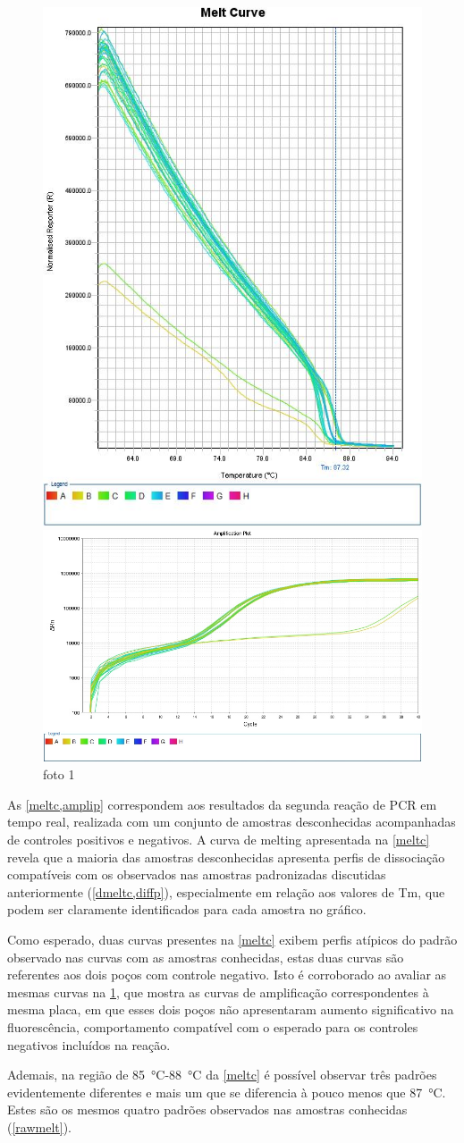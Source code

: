 \begin{figure}
        \centering
        \includegraphics[width=.4\textwidth]{fig/Melt Curve.jpg}
        \caption{foto 1}
        \label{meltc}
        \includegraphics[width=.4\textwidth]{fig/Amplification Plot.jpg}
        \caption{foto 1}
        \label{amplip}
\end{figure}

As \cref{meltc,amplip} correspondem aos resultados da segunda reação de PCR em
tempo real, realizada com um conjunto de amostras desconhecidas acompanhadas de
controles positivos e negativos. A curva de melting apresentada na \cref{meltc}
revela que a maioria das amostras desconhecidas apresenta perfis de dissociação
compatíveis com os observados nas amostras padronizadas discutidas anteriormente
(\cref{dmeltc,diffp}), especialmente em relação aos valores de Tm, que podem ser
claramente identificados para cada amostra no gráfico.

Como esperado, duas curvas presentes na \cref{meltc} exibem perfis atípicos do
padrão observado nas curvas com as amostras conhecidas, estas duas curvas são
referentes aos dois poços com controle negativo. Isto é corroborado ao avaliar
as mesmas curvas na \cref{amplip}, que mostra as curvas de amplificação
correspondentes à mesma placa, em que esses dois poços não apresentaram aumento
significativo na fluorescência, comportamento compatível com o esperado para os
controles negativos incluídos na reação.

Ademais, na região de \qty{85}{\celsius}-\qty{88}{\celsius} da \cref{meltc} é
possível observar três padrões evidentemente diferentes e mais um que se
diferencia à pouco menos que \qty{87}{\celsius}. Estes são os mesmos quatro
padrões observados nas amostras conhecidas (\cref{rawmelt}).

